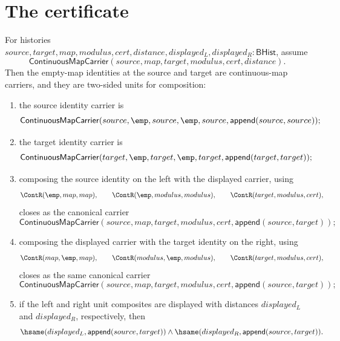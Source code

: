 \section{The certificate}
\label{sec:continuousmap-certificate}

\begin{theorem}
\label{thm:continuousmap-empty-identities-two-sided-composition-units}
For histories
$source,target,map,modulus,cert,distance,displayed_L,displayed_R:\mathsf{BHist}$,
assume
$$
\mathsf{ContinuousMapCarrier}(source,map,target,modulus,cert,distance).
$$
Then the empty-map identities at the source and target are continuous-map
carriers, and they are two-sided units for composition:
\begin{enumerate}
\item the source identity carrier is
$$
\mathsf{ContinuousMapCarrier}
(source,\emp,source,\emp,source,\mathsf{append}(source,source));
$$

\item the target identity carrier is
$$
\mathsf{ContinuousMapCarrier}
(target,\emp,target,\emp,target,\mathsf{append}(target,target));
$$

\item composing the source identity on the left with the displayed carrier,
using
$$
\ContR(\emp,map,map),\qquad
\ContR(\emp,modulus,modulus),\qquad
\ContR(target,modulus,cert),
$$
closes as the canonical carrier
$$
\mathsf{ContinuousMapCarrier}
(source,map,target,modulus,cert,\mathsf{append}(source,target));
$$

\item composing the displayed carrier with the target identity on the right,
using
$$
\ContR(map,\emp,map),\qquad
\ContR(modulus,\emp,modulus),\qquad
\ContR(target,modulus,cert),
$$
closes as the same canonical carrier
$$
\mathsf{ContinuousMapCarrier}
(source,map,target,modulus,cert,\mathsf{append}(source,target));
$$

\item if the left and right unit composites are displayed with distances
$displayed_L$ and $displayed_R$, respectively, then
$$
\hsame(displayed_L,\mathsf{append}(source,target))\land
\hsame(displayed_R,\mathsf{append}(source,target)).
$$
\end{enumerate}
\end{theorem}

